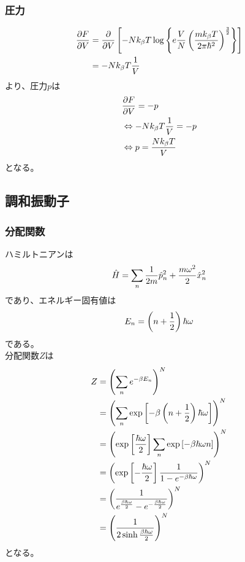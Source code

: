 \documentclass{jsarticle}  %
\numberwithin{equation}{section} %
\numberwithin{figure}{section}
\begin{document}
\subsubsection{圧力}
    \begin{align}
        \frac{\partial F}{\partial V} &= \frac{\partial }{\partial V} \left[ -Nk_\beta T \log \left\{ e\frac{V}{N} \left( \frac{mk_\beta T}{2\pi \hbar^2 } \right)^{\frac{3}{2}} \right\} \right] \notag \\
        &= -Nk_\beta T \frac{1}{V}
    \end{align}
    より、圧力$p$は
    \begin{align}
        &\frac{\partial F}{\partial V} = -p \notag \\
        &\Leftrightarrow -Nk_\beta T \frac{1}{V} = -p \notag \\
        &\Leftrightarrow p = \frac{Nk_\beta T}{V}
    \end{align}
    となる。
\subsection{調和振動子}
\subsubsection{分配関数}
    ハミルトニアンは
    \begin{align}
        \hat{H} = \sum_n \frac{1}{2m}\hat{p}_n^2 + \frac{m\omega^2}{2} \hat{x}_n^2 \notag
    \end{align}
    であり、エネルギー固有値は
    \begin{align}
        E_n = \left( n + \frac{1}{2}\right)\hbar \omega \notag 
    \end{align}
    である。\\
    分配関数$Z$は
    \begin{align}
        Z &= \left( \sum_n e^{-\beta E_n} \right)^N \notag \\
        &= \left( \sum_n \exp \left[ -\beta \left( n + \frac{1}{2}\right)\hbar \omega \right] \right)^N \notag \\
        &= \left( \exp\left[ \frac{\hbar \omega}{2} \right] \sum_n \exp \left[ -\beta \hbar \omega n \right] \right)^N \notag \\
        &= \left( \exp\left[ -\frac{\hbar \omega}{2} \right] \frac{1}{1 - e^{-\beta \hbar \omega }} \right)^N \notag \\
        &= \left( \frac{1}{e^{\frac{\beta \hbar \omega}{2}} - e^{-\frac{\beta \hbar \omega}{2}}} \right)^N \notag \\
        &= \left( \frac{1}{2\sinh \frac{\beta \hbar \omega}{2}} \right)^N \notag 
    \end{align}
    となる。
\end{document}
